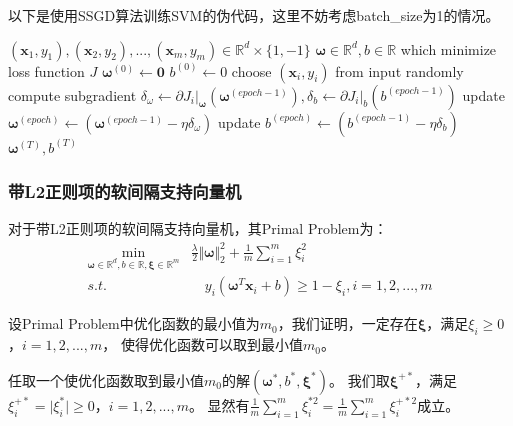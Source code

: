 \documentclass[12pt, a4paper]{article}
\newcommand{\ivec}{\bm}
\newcommand{\omegav}{\ivec{\omega}}
\newcommand{\xiv}{\ivec{\xi}}
\newcommand{\xv}{\ivec{x}}
\begin{document}
        以下是使用SSGD算法训练SVM的伪代码，这里不妨考虑batch\_size为1的情况。

        \begin{algorithm}[htbp]
        \caption{Training SVM with SSGD}
        \begin{algorithmic}[1]
            \Require $(\xv_1, y_1), (\xv_2, y_2), ..., (\xv_m, y_m) \in \mathbb{R}^d \times \{1, -1\}$
            \Ensure $\omegav \in \mathbb{R}^d, b \in \mathbb{R}$ which minimize loss function $J$
            \State $\omegav^{(0)} \gets \ivec{0}$
            \State $b^{(0)} \gets 0$
             
                \State choose $(\xv_i, y_i)$ from input randomly
                \State compute subgradient $\delta_{\omega} \gets \partial J_i \big|_{\omegav}(\omegav^{(epoch - 1)}), \delta_{b} \gets \partial J_i \big|_{b}(b^{(epoch - 1)})$
                \State update $\omegav^{(epoch)} \gets (\omegav^{(epoch - 1)} - \eta \delta_{\omega})$ 
                \State update $b^{(epoch)} \gets (b^{(epoch - 1)} - \eta \delta_{b})$
            \EndFor
            \State \Return $\omegav^{(T)}, b^{(T)}$
        \end{algorithmic}
        \end{algorithm}

    \subsubsection{带L2正则项的软间隔支持向量机}

        对于带L2正则项的软间隔支持向量机，其Primal Problem为：
        \begin{equation}\begin{aligned}
        \min\limits_{\omegav \in \mathbb{R}^d, b \in \mathbb{R}, \xiv \in \mathbb{R}^m}& \frac{\lambda}{2} \Vert \omegav \Vert_2^2 + \frac{1}{m} \sum_{i = 1}^{m} \xi_i^2 \\
        s.t.& \quad y_i (\omegav^T \xv_i + b) \ge 1 - \xi_i, i = 1, 2, ..., m
        \end{aligned}\end{equation}

        设Primal Problem中优化函数的最小值为$m_0$，我们证明，一定存在$\xiv$，满足$\xi_i \ge 0$，$i = 1, 2, ..., m$，
        使得优化函数可以取到最小值$m_0$。

        任取一个使优化函数取到最小值$m_0$的解$(\omegav^*, b^*, \xiv^*)$。
        我们取$\xiv^{+*}$，满足$\xi_i^{+*} = \vert \xi_i^* \vert \ge 0$，$i = 1, 2, ..., m$。
        显然有$\frac{1}{m} \sum_{i = 1}^{m} \xi_i^{*2} = \frac{1}{m} \sum_{i = 1}^{m} \xi_i^{+*2}$成立。
\end{document}
